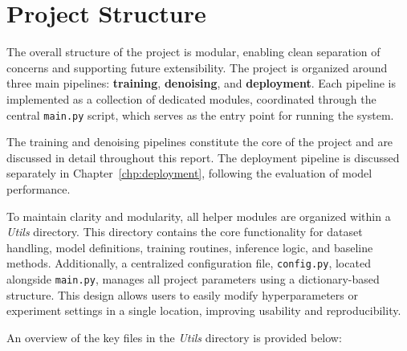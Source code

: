 \chapter{Project Structure}
\label{chp:project_structure}

The overall structure of the project is modular, enabling clean separation of concerns and supporting future extensibility. The project is organized around three main pipelines: \textbf{training}, \textbf{denoising}, and \textbf{deployment}. Each pipeline is implemented as a collection of dedicated modules, coordinated through the central \texttt{main.py} script, which serves as the entry point for running the system.

The training and denoising pipelines constitute the core of the project and are discussed in detail throughout this report. The deployment pipeline is discussed separately in Chapter~\ref{chp:deployment}, following the evaluation of model performance.

To maintain clarity and modularity, all helper modules are organized within a \textit{Utils} directory. This directory contains the core functionality for dataset handling, model definitions, training routines, inference logic, and baseline methods. Additionally, a centralized configuration file, \texttt{config.py}, located alongside \texttt{main.py}, manages all project parameters using a dictionary-based structure. This design allows users to easily modify hyperparameters or experiment settings in a single location, improving usability and reproducibility.

An overview of the key files in the \textit{Utils} directory is provided below:

